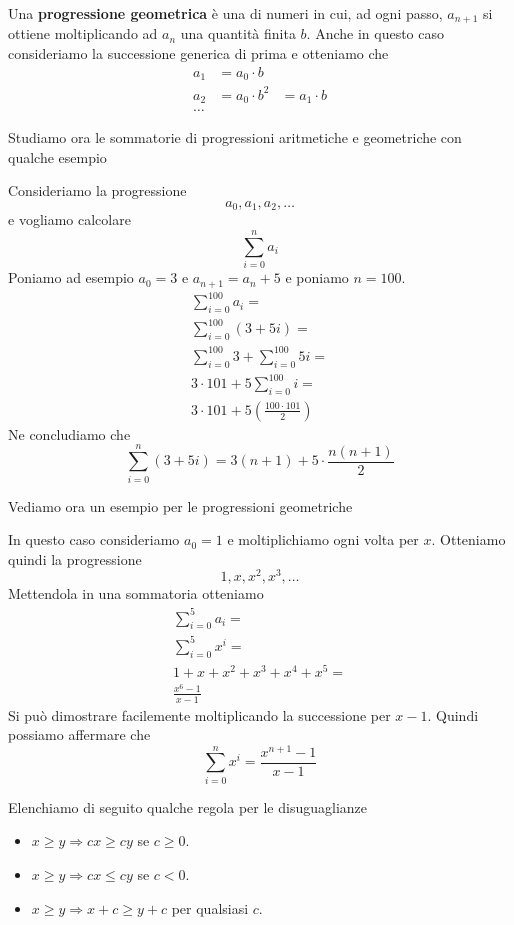 \begin{definition}
	Una \textbf{progressione geometrica} \`e una di numeri in cui, ad ogni passo, $a_{n + 1}$
	si ottiene moltiplicando ad $a_n$ una quantit\`a finita $b$.
	Anche in questo caso consideriamo la successione generica di prima e otteniamo che
	\[
		\begin{array}{lll}
			a_1 & = a_0 \cdot b   &               \\
			a_2 & = a_0 \cdot b^2 & = a_1 \cdot b \\
			\dots
		\end{array}
	\]
\end{definition}

Studiamo ora le sommatorie di progressioni aritmetiche e geometriche con qualche esempio
\begin{example}
	Consideriamo la progressione
	\[
		a_0, a_1, a_2, \dots
	\]
	e vogliamo calcolare
	\[
		\sum_{i = 0}^n a_i
	\]
	Poniamo ad esempio $a_0 = 3$ e $a_{n + 1} = a_n + 5$ e poniamo $n = 100$.
	\begin{gather*}
		\sum_{i = 0}^{100} a_i                        = \\
		\sum_{i = 0}^{100} (3 + 5i)                   = \\
		\sum_{i = 0}^{100} 3 + \sum_{i = 0}^{100} 5i  = \\
		3 \cdot 101 + 5 \sum_{i = 0}^{100} i          = \\
		3 \cdot 101 + 5 \left( \frac{100 \cdot 101}{2} \right)
	\end{gather*}
	Ne concludiamo che
	\[
		\sum_{i = 0}^n (3 + 5i) = 3(n + 1) + 5 \cdot \frac{n(n + 1)}{2}
	\]
\end{example}

Vediamo ora un esempio per le progressioni geometriche
\begin{example}
	In questo caso consideriamo $a_0 = 1$ e moltiplichiamo ogni volta per $x$. Otteniamo quindi
	la progressione
	\[
		1, x, x^2, x^3, \dots
	\]
	Mettendola in una sommatoria otteniamo
	\begin{gather*}
		\sum_{i = 0}^5 a_i = \\
		\sum_{i = 0}^5 x^i = \\
		1 + x + x^2 + x^3 + x^4 + x^5 = \\
		\frac{x^6 - 1}{x - 1}
	\end{gather*}
	Si pu\`o dimostrare facilemente moltiplicando la successione per $x - 1$.
	Quindi possiamo affermare che
	\[
		\sum_{i = 0}^n x^i = \frac{x^{n + 1} - 1}{x - 1}
	\]
\end{example}

Elenchiamo di seguito qualche regola per le disuguaglianze
\begin{itemize}
	\item $x \geq y \Rightarrow cx \geq cy$ se $c \geq 0$.
	\item $x \geq y \Rightarrow cx \leq cy$ se $c < 0$.
	\item $x \geq y \Rightarrow x + c \geq y + c$ per qualsiasi $c$.
\end{itemize}
